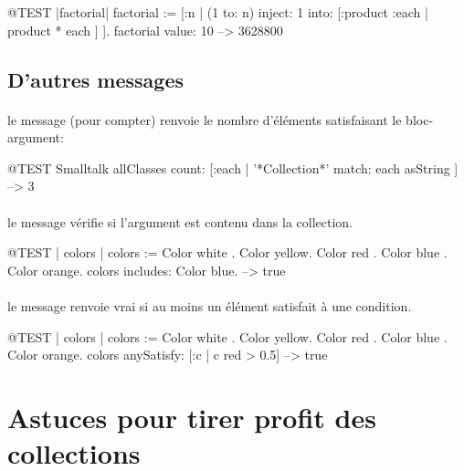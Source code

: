 \documentclass[a4paper,10pt,twoside]{book}
\begin{document}
\begin{code}{@TEST |factorial|}
factorial := [:n | (1 to: n) inject: 1 into: [:product :each | product * each ] ].
factorial value: 10 --> 3628800
\end{code}

\subsection{D'autres messages}

\paragraph{} le message  (pour compter) renvoie le nombre d'éléments satisfaisant le bloc-argument: %

\begin{code}{@TEST}
Smalltalk allClasses count: [:each | '*Collection*' match: each asString ] --> 3
\end{code} %

\paragraph{} le message  vérifie si l'argument est contenu dans la collection.

\begin{code}{@TEST | colors |}
colors := {Color white . Color yellow. Color red . Color blue . Color orange}.
colors includes: Color blue. --> true
\end{code}

\paragraph{} le message  renvoie vrai si au moins un élément satisfait à une condition. 

\begin{code}{@TEST | colors | colors := {Color white . Color yellow. Color red . Color blue . Color orange}.}
colors anySatisfy: [:c | c red > 0.5] --> true
\end{code}
\section{Astuces pour tirer profit des collections}
\end{document}
